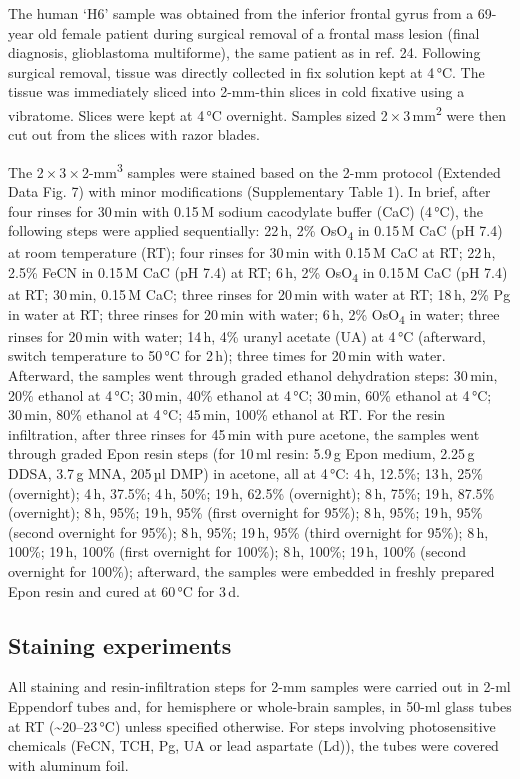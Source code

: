 \documentclass{article}
\begin{document}
The human ‘H6’ sample was obtained from the inferior frontal gyrus from a 69-year old female patient during surgical removal of a frontal mass lesion (final diagnosis, glioblastoma multiforme), the same patient as in ref. 24. Following surgical removal, tissue was directly collected in fix solution kept at 4\,°C. The tissue was immediately sliced into 2-mm-thin slices in cold fixative using a vibratome. Slices were kept at 4\,°C overnight. Samples sized 2\,×\,3\,mm\textsuperscript{2} were then cut out from the slices with razor blades.

The 2\,×\,3\,×\,2-mm\textsuperscript{3} samples were stained based on the 2-mm protocol (Extended Data Fig. 7) with minor modifications (Supplementary Table 1). In brief, after four rinses for 30\,min with 0.15\,M sodium cacodylate buffer (CaC) (4\,°C), the following steps were applied sequentially: 22\,h, 2\% OsO\textsubscript{4} in 0.15\,M CaC (pH 7.4) at room temperature (RT); four rinses for 30\,min with 0.15\,M CaC at RT; 22\,h, 2.5\% FeCN in 0.15\,M CaC (pH 7.4) at RT; 6\,h, 2\% OsO\textsubscript{4} in 0.15\,M CaC (pH 7.4) at RT; 30\,min, 0.15\,M CaC; three rinses for 20\,min with water at RT; 18\,h, 2\% Pg in water at RT; three rinses for 20\,min with water; 6\,h, 2\% OsO\textsubscript{4} in water; three rinses for 20\,min with water; 14\,h, 4\% uranyl acetate (UA) at 4\,°C (afterward, switch temperature to 50\,°C for 2\,h); three times for 20\,min with water. Afterward, the samples went through graded ethanol dehydration steps: 30\,min, 20\% ethanol at 4\,°C; 30\,min, 40\% ethanol at 4\,°C; 30\,min, 60\% ethanol at 4\,°C; 30\,min, 80\% ethanol at 4\,°C; 45\,min, 100\% ethanol at RT. For the resin infiltration, after three rinses for 45\,min with pure acetone, the samples went through graded Epon resin steps (for 10\,ml resin: 5.9\,g Epon medium, 2.25\,g DDSA, 3.7\,g MNA, 205\,µl DMP) in acetone, all at 4\,°C: 4\,h, 12.5\%; 13\,h, 25\% (overnight); 4\,h, 37.5\%; 4\,h, 50\%; 19\,h, 62.5\% (overnight); 8\,h, 75\%; 19\,h, 87.5\% (overnight); 8\,h, 95\%; 19\,h, 95\% (first overnight for 95\%); 8\,h, 95\%; 19\,h, 95\% (second overnight for 95\%); 8\,h, 95\%; 19\,h, 95\% (third overnight for 95\%); 8\,h, 100\%; 19\,h, 100\% (first overnight for 100\%); 8\,h, 100\%; 19\,h, 100\% (second overnight for 100\%); afterward, the samples were embedded in freshly prepared Epon resin and cured at 60\,°C for 3\,d.

\subsection*{Staining experiments}
All staining and resin-infiltration steps for 2-mm samples were carried out in 2-ml Eppendorf tubes and, for hemisphere or whole-brain samples, in 50-ml glass tubes at RT (\textasciitilde{}20–23\,°C) unless specified otherwise. For steps involving photosensitive chemicals (FeCN, TCH, Pg, UA or lead aspartate (Ld)), the tubes were covered with aluminum foil.
\end{document}
